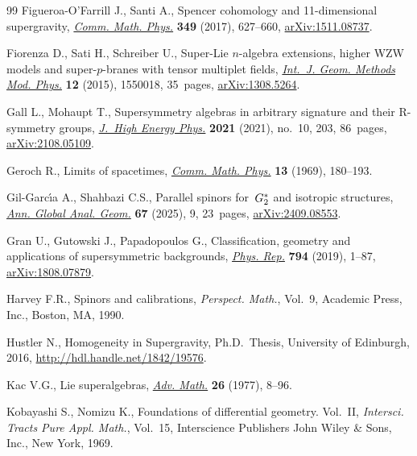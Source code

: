 \documentclass[11pt]{article}
\numberwithin{equation}{section}
\numberwithin{equation}{section}
\newcommand{\1}{\mathbbm{1}}
\begin{document}
\begin{thebibliography}{99}
Figueroa-O'Farrill J., Santi A., Spencer cohomology and 11-dimensional
 supergravity, \href{https://doi.org/10.1007/s00220-016-2700-1}{\textit{Comm.
 Math. Phys.}} \textbf{349} (2017), 627--660,
 \href{http://arxiv.org/abs/1511.08737}{arXiv:1511.08737}.

Fiorenza D., Sati H., Schreiber U., Super-{L}ie {$n$}-algebra extensions,
 higher {WZW} models and super-{$p$}-branes with tensor multiplet fields,
 \href{https://doi.org/10.1142/S0219887815500188}{\textit{Int.~J. Geom.
 Methods Mod. Phys.}} \textbf{12} (2015), 1550018, 35~pages,
 \href{http://arxiv.org/abs/1308.5264}{arXiv:1308.5264}.

Gall L., Mohaupt T., Supersymmetry algebras in arbitrary signature and their
 {R}-symmetry groups,
 \href{https://doi.org/10.1007/jhep10(2021)203}{\textit{J.~High Energy Phys.}}
 \textbf{2021} (2021), no.~10, 203, 86~pages,
 \href{http://arxiv.org/abs/2108.05109}{arXiv:2108.05109}.

Geroch R., Limits of spacetimes,
 \href{https://doi.org/10.1007/BF01645486}{\textit{Comm. Math. Phys.}}
 \textbf{13} (1969), 180--193.

Gil-Garc\'{\i}a A., Shahbazi C.S., Parallel spinors for~{${\rm G}_2^*$} and
 isotropic structures,
 \href{https://doi.org/10.1007/s10455-025-09987-y}{\textit{Ann. Global Anal.
 Geom.}} \textbf{67} (2025), 9, 23~pages,
 \href{http://arxiv.org/abs/2409.08553}{arXiv:2409.08553}.

Gran U., Gutowski J., Papadopoulos G., Classification, geometry and
 applications of supersymmetric backgrounds,
 \href{https://doi.org/10.1016/j.physrep.2018.11.005}{\textit{Phys. Rep.}}
 \textbf{794} (2019), 1--87,
 \href{http://arxiv.org/abs/1808.07879}{arXiv:1808.07879}.

Harvey F.R., Spinors and calibrations, \textit{Perspect. Math.}, Vol.~9,
 Academic Press, Inc., Boston, MA, 1990.

Hustler N., Homogeneity in Supergravity, Ph.D.~Thesis, {U}niversity of
 Edinburgh, 2016, \url{http://hdl.handle.net/1842/19576}.

Kac V.G., Lie superalgebras,
 \href{https://doi.org/10.1016/0001-8708(77)90017-2}{\textit{Adv. Math.}}
 \textbf{26} (1977), 8--96.

Kobayashi S., Nomizu K., Foundations of differential geometry. {V}ol.~{II},
 \textit{Intersci. Tracts Pure Appl. Math.}, Vol.~15, Interscience Publishers
 John Wiley \& Sons, Inc., New York, 1969.


\end{thebibliography}
\end{document}
